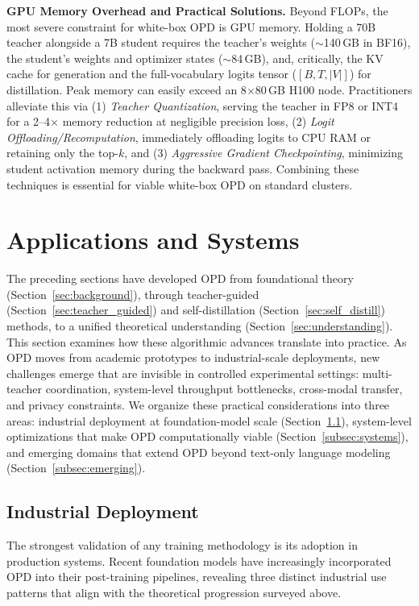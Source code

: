 \documentclass{article} %
\begin{document}
\textbf{GPU Memory Overhead and Practical Solutions.} Beyond FLOPs, the most severe constraint for white-box OPD is GPU memory. Holding a 70B teacher alongside a 7B student requires the teacher's weights ($\sim$140\,GB in BF16), the student's weights and optimizer states ($\sim$84\,GB), and, critically, the KV cache for generation and the full-vocabulary logits tensor ($[B, T, |V|]$) for distillation. Peak memory can easily exceed an 8$\times$80\,GB H100 node. Practitioners alleviate this via (1) \textit{Teacher Quantization}, serving the teacher in FP8 or INT4 for a 2--4$\times$ memory reduction at negligible precision loss, (2) \textit{Logit Offloading/Recomputation}, immediately offloading logits to CPU RAM or retaining only the top-$k$, and (3) \textit{Aggressive Gradient Checkpointing}, minimizing student activation memory during the backward pass. Combining these techniques is essential for viable white-box OPD on standard clusters.

\section{Applications and Systems}
\label{sec:applications}

The preceding sections have developed OPD from foundational theory (Section~\ref{sec:background}), through teacher-guided (Section~\ref{sec:teacher_guided}) and self-distillation (Section~\ref{sec:self_distill}) methods, to a unified theoretical understanding (Section~\ref{sec:understanding}). This section examines how these algorithmic advances translate into practice. As OPD moves from academic prototypes to industrial-scale deployments, new challenges emerge that are invisible in controlled experimental settings: multi-teacher coordination, system-level throughput bottlenecks, cross-modal transfer, and privacy constraints. We organize these practical considerations into three areas: industrial deployment at foundation-model scale (Section~\ref{subsec:industrial}), system-level optimizations that make OPD computationally viable (Section~\ref{subsec:systems}), and emerging domains that extend OPD beyond text-only language modeling (Section~\ref{subsec:emerging}).

\subsection{Industrial Deployment}
\label{subsec:industrial}

The strongest validation of any training methodology is its adoption in production systems. Recent foundation models have increasingly incorporated OPD into their post-training pipelines, revealing three distinct industrial use patterns that align with the theoretical progression surveyed above.
\end{document}
